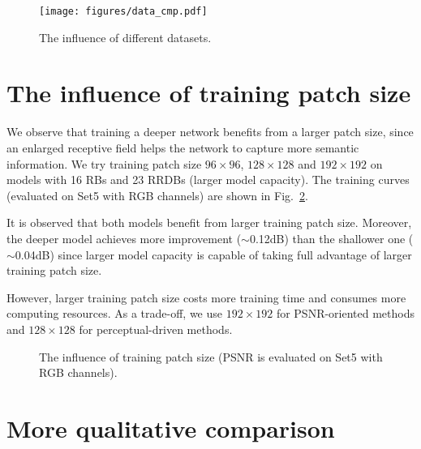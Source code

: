 \documentclass[runningheads]{llncs}
\begin{document}
\begin{figure}[htbp]
	\vspace{-0.4cm}
	\begin{center}
		\texttt{[image: figures/data\_cmp.pdf]}
	\end{center}
	\vspace{-0.4cm}
	\caption{The influence of different datasets.}
	\vspace{-0.5cm}
	\label{fig:data_cmp}
\end{figure}


\section{The influence of training patch size} \label{sec:influence_patch_size}

We observe that training a deeper network benefits from a larger patch size, since an enlarged receptive field helps 
the network to capture more semantic information. 
%
We try training patch size $96\times96$, $128\times128$ and $192\times192$ on models with 16 RBs and 23 RRDBs (larger 
model capacity). The training curves (evaluated on Set5 with RGB channels) are shown in Fig.~\ref{fig:patch_size}. 

It is observed that both models benefit from larger training patch size.
Moreover, the deeper model achieves more improvement ($\sim$0.12dB) than the shallower one ($\sim$0.04dB) since
larger model capacity is capable of taking full advantage of larger training patch size.

However, larger training patch size costs more training time and consumes more computing resources. 
%
As a trade-off, we use $192\times192$ for PSNR-oriented methods and $128\times128$ for perceptual-driven methods.

\begin{figure}[htbp]%
	\vspace{-0.7cm}
	\centering
	\qquad
	\caption{The influence of training patch size (PSNR is evaluated on Set5 with RGB \mbox{channels}).}%
	\label{fig:patch_size}%
	\vspace{-0.5cm}
\end{figure}

\section{More qualitative comparison} \label{sec:qualitative_cmp}
\end{document}
